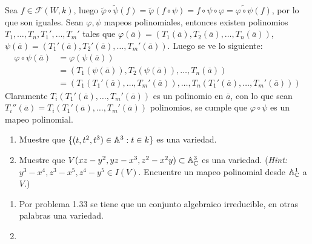 \begin{sol}{2.6}
    Sea \(f\in\mathscr{F}(W,k)\), luego \(\widetilde{\varphi}\circ\widetilde{\psi}(f)=\widetilde{\varphi}(f\circ\psi)=f\circ\psi\circ\varphi=\widetilde{\varphi\circ\psi}(f)\), por lo que son iguales. Sean \(\varphi,\psi\) mapeos polinomiales, entonces existen polinomios \(T_1,\dots,T_n,T_1',\dots,T_m'\) tales que \(\varphi(\overline{a})=(T_1(\overline{a}),T_2(\overline{a}),\dots,T_n(\overline{a}))\), \(\psi(\overline{a})=(T_1'(\overline{a}),T_2'(\overline{a}),\dots,T_m'(\overline{a}))\). Luego se ve lo siguiente:
    \begin{align*}
        \varphi\circ\psi(\overline{a}) & =\varphi(\psi(\overline{a}))                                                                               \\
                                       & =(T_1(\psi(\overline{a})),T_2(\psi(\overline{a})),\dots,T_n(\overline{a}))                                 \\
                                       & =(T_1(T_1'(\overline{a}),\dots,T_m'(\overline{a})),\dots,T_n(T_1'(\overline{a}),\dots,T_m'(\overline{a})))
    \end{align*}
    Claramente \(T_i(T_1'(\overline{a}),\dots,T_m'(\overline{a}))\) es un polinomio en \(\overline{a}\), con lo que sean \(T_i''(\overline{a})=T_i(T_1'(\overline{a}),\dots,T_m'(\overline{a}))\) polinomios, se cumple que \(\varphi\circ\psi\) es un mapeo polinomial.
\end{sol}

\begin{prob}{2.8}
    \begin{enumerate}
        \item Muestre que \(\{(t,t^2,t^3)\in\mathbb{A}^3:t\in k\}\) es una variedad.
        \item Muestre que \(V(xz-y^2,yz-x^3,z^2-x^2y)\subset\mathbb{A}_{\mathbb{C}}^3\) es una variedad. (\textit{Hint:} \(y^3-x^4,z^3-x^5,z^4-y^5\in I(V)\). Encuentre un mapeo polinomial desde \(\mathbb{A}_{\mathbb{C}}^1\) a \(V\).)
    \end{enumerate}
\end{prob}

\begin{sol}{2.8}
    \begin{enumerate}
        \item Por problema 1.33 se tiene que un conjunto algebraico irreducible, en otras palabras una variedad.
        \item
    \end{enumerate}
\end{sol}

